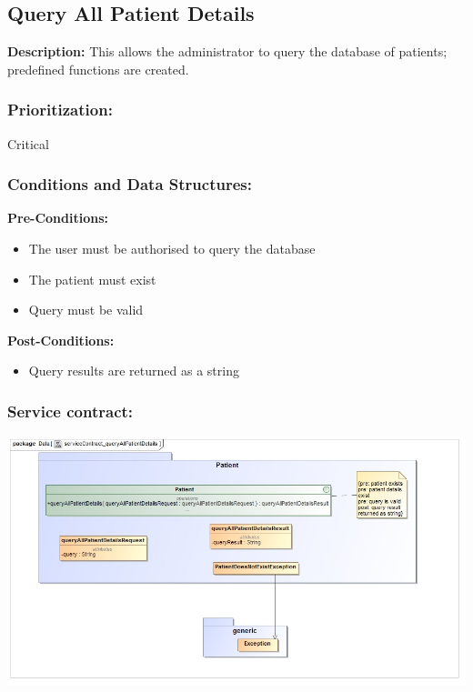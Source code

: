 \subsection{Query All Patient Details}
\textbf{Description:}
This allows the administrator to query the database of patients; predefined functions are created.
\subsubsection{Prioritization:}
Critical
\subsubsection{Conditions and Data Structures:}
\textbf{Pre-Conditions:}
	\begin{itemize}
	\item The user must be authorised to query the database
	\item The patient must exist
	\item Query must be valid
	\end{itemize}
\textbf{Post-Conditions:}
	\begin{itemize}
	\item Query results are returned as a string
	\end{itemize}	
\subsubsection{Service contract:}
\includegraphics[width=1\linewidth]{./Graphics/3.jpg}
